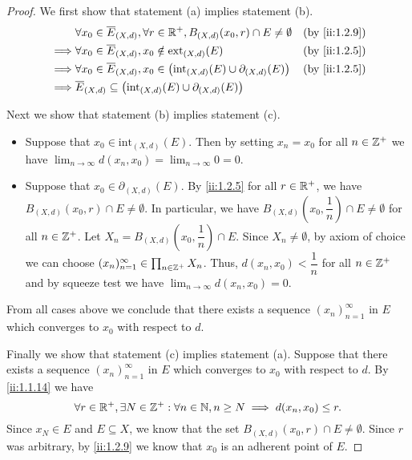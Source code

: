 \begin{proof}
  We first show that statement (a) implies statement (b).
  \begin{align*}
             & \forall x_0 \in \overline{E}_{(X, d)}, \forall r \in \R^+, B_{(X, d)}(x_0, r) \cap E \neq \emptyset       &  & \by{ii:1.2.9} \\
    \implies & \forall x_0 \in \overline{E}_{(X, d)}, x_0 \notin \text{ext}_{(X, d)}(E)                                  &  & \by{ii:1.2.5} \\
    \implies & \forall x_0 \in \overline{E}_{(X, d)}, x_0 \in \big(\text{int}_{(X, d)}(E) \cup \partial_{(X, d)}(E)\big) &  & \by{ii:1.2.5} \\
    \implies & \overline{E}_{(X, d)} \subseteq \big(\text{int}_{(X, d)}(E) \cup \partial_{(X, d)}(E)\big)
  \end{align*}

  Next we show that statement (b) implies statement (c).
  \begin{itemize}
    \item Suppose that \(x_0 \in \text{int}_{(X, d)}(E)\).
          Then by setting \(x_n = x_0\) for all \(n \in \mathbb{Z}^+\) we have \(\lim_{n \to \infty} d(x_n, x_0) = \lim_{n \to \infty} 0 = 0\).
    \item Suppose that \(x_0 \in \partial_{(X, d)}(E)\).
          By \cref{ii:1.2.5} for all \(r \in \mathbb{R}^+\), we have \(B_{(X, d)}(x_0, r) \cap E \neq \emptyset\).
          In particular, we have \(B_{(X, d)}(x_0, \dfrac{1}{n}) \cap E \neq \emptyset\) for all \(n \in \mathbb{Z}^+\).
          Let \(X_n = B_{(X, d)}(x_0, \dfrac{1}{n}) \cap E\).
          Since \(X_n \neq \emptyset\), by axiom of choice we can choose \((x_n)_{n = 1}^\infty \in \prod_{n \in \mathbb{Z}^+} X_n\).
          Thus, \(d(x_n, x_0) < \dfrac{1}{n}\) for all \(n \in \mathbb{Z}^+\) and by squeeze test we have \(\lim_{n \to \infty} d(x_n, x_0) = 0\).
  \end{itemize}
  From all cases above we conclude that there exists a sequence \((x_n)_{n = 1}^\infty\) in \(E\) which converges to \(x_0\) with respect to \(d\).

  Finally we show that statement (c) implies statement (a).
  Suppose that there exists a sequence \((x_n)_{n = 1}^\infty\) in \(E\) which converges to \(x_0\) with respect to \(d\).
  By \cref{ii:1.1.14} we have
  \[
    \forall r \in \mathbb{R}^+, \exists N \in \mathbb{Z}^+ : \forall n \in \mathbb{N}, n \geq N \implies d(x_n, x_0) \leq r.
  \]
  Since \(x_N \in E\) and \(E \subseteq X\), we know that the set \(B_{(X, d)}(x_0, r) \cap E \neq \emptyset\).
  Since \(r\) was arbitrary, by \cref{ii:1.2.9} we know that \(x_0\) is an adherent point of \(E\).
\end{proof}

